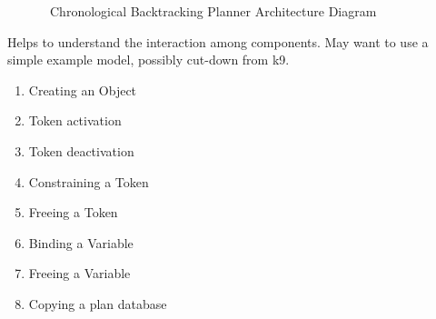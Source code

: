\documentclass[10pt, letterpaper, twoside]{article}
\begin{document}
\begin{figure}[hbt]
\centering{}
\caption{\ET\, Chronological Backtracking Planner Architecture Diagram}
\label{CBPlannerDiagram}
\end{figure}


Helps to understand the interaction among components. May want to use
a simple example model, possibly cut-down from k9.
\begin{enumerate}
\item Creating an Object
\item Token activation
\item Token deactivation
\item Constraining a Token
\item Freeing a Token
\item Binding a Variable
\item Freeing a Variable
\item Copying a plan database
\end{enumerate}
\end{document}
